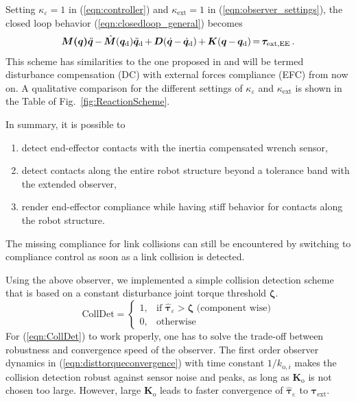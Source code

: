 Setting $\kappa_{\varepsilon}=1$ in (\ref{eqn:controller}) and $\kappa_{\mathrm{ext}}=1$ in (\ref{eqn:observer_settings}), the closed loop behavior (\ref{eqn:closedloop_general}) becomes
%
\begin{equation}
\medmuskip=3mu
\thinmuskip=3mu
\thickmuskip=3mu
\bm{M(\bm{q})}\ddot{\bm{q}}-\hat{\bm{M}}(\bm{q}_\mathrm{d})\ddot{\bm{q}}_\mathrm{d}
+\bm{D}(\dot{\bm{q}}-\dot{\bm{q}}_\mathrm{d})
+\bm{K}(\bm{q}-\bm{q}_\mathrm{d})=
\bm{\tau}_\mathrm{ext,EE}\;.
\label{eqn:regainComp}
\end{equation}
This scheme has similarities to the one proposed in \cite{Oh1999} and will be termed disturbance compensation (DC) with external forces compliance (EFC) from now on. A qualitative comparison for the different settings of $\kappa_{\varepsilon}$ and $\kappa_\mathrm{ext}$ is shown in the Table of Fig.~\ref{fig:ReactionScheme}.
%

In summary, it is possible to 
%
\begin{enumerate}
\item detect end-effector contacts with the inertia compensated wrench sensor,
\item detect contacts along the entire robot structure beyond a tolerance band with the extended observer,
\item render end-effector compliance while having stiff behavior for contacts along the robot structure.
\end{enumerate}

The missing compliance for link collisions can still be encountered by switching to compliance control as soon as a link collision is detected. 

Using the above observer, we implemented a simple collision detection scheme that is based on a constant disturbance joint torque threshold ${\bm{\zeta}}$.
%
\begin{equation}
\text{CollDet}=
\begin{cases}
    1,& \text{if } \hat{\bm{\tau}}_{\varepsilon} > {\bm{\zeta}} \text{ (component wise)}\\
    0,& \text{otherwise}
\end{cases}
\label{eqn:CollDet}
\end{equation}
For (\ref{eqn:CollDet}) to work properly, one has to solve the trade-off between robustness and convergence speed of the observer.
The first order observer dynamics in (\ref{eqn:disttorqueconvergence}) with time constant $1/k_{\mathrm{o},i}$ makes the collision detection robust against sensor noise and peaks, as long as $\bm{K}_{\mathrm{o}}$ is not chosen too large.
However, large $\bm{K}_{\mathrm{o}}$ leads to faster convergence of $\hat{\bm{\tau}}_\mathrm{\varepsilon}$ to $\bm{\tau}_\mathrm{ext}$.

